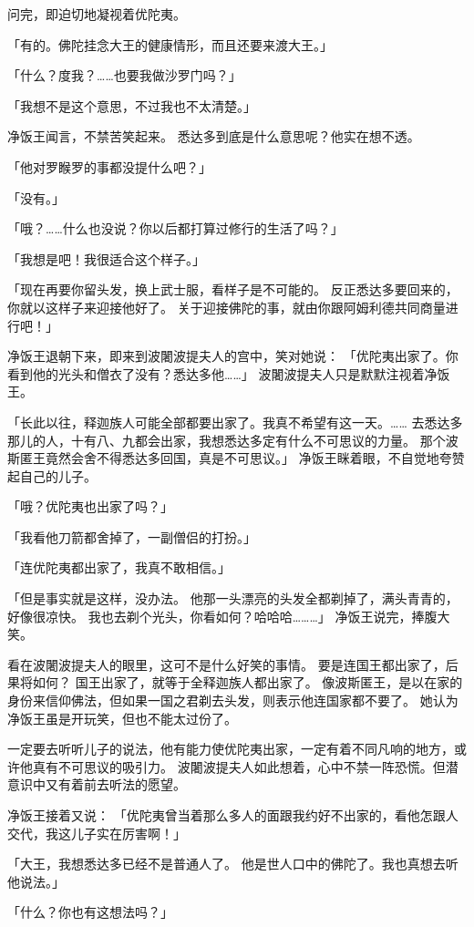 \documentclass[twoside,openany]{book}
\begin{document}
问完，即迫切地凝视着优陀夷。

「有的。佛陀挂念大王的健康情形，而且还要来渡大王。」

「什么？度我？……也要我做沙罗门吗？」

「我想不是这个意思，不过我也不太清楚。」

净饭王闻言，不禁苦笑起来。
悉达多到底是什么意思呢？他实在想不透。

「他对罗睺罗的事都没提什么吧？」

「没有。」

「哦？……什么也没说？你以后都打算过修行的生活了吗？」

「我想是吧！我很适合这个样子。」

「现在再要你留头发，换上武士服，看样子是不可能的。
反正悉达多要回来的，你就以这样子来迎接他好了。
关于迎接佛陀的事，就由你跟阿姆利德共同商量进行吧！」

净饭王退朝下来，即来到波闍波提夫人的宫中，笑对她说：
「优陀夷出家了。你看到他的光头和僧衣了没有？悉达多他……」
波闍波提夫人只是默默注视着净饭王。

「长此以往，释迦族人可能全部都要出家了。我真不希望有这一天。……
去悉达多那儿的人，十有八、九都会出家，我想悉达多定有什么不可思议的力量。
那个波斯匿王竟然会舍不得悉达多回国，真是不可思议。」
净饭王眯着眼，不自觉地夸赞起自己的儿子。

「哦？优陀夷也出家了吗？」

「我看他刀箭都舍掉了，一副僧侣的打扮。」

「连优陀夷都出家了，我真不敢相信。」

「但是事实就是这样，没办法。
他那一头漂亮的头发全都剃掉了，满头青青的，好像很凉快。
我也去剃个光头，你看如何？哈哈哈………」
净饭王说完，捧腹大笑。

看在波闍波提夫人的眼里，这可不是什么好笑的事情。
要是连国王都出家了，后果将如何？
国王出家了，就等于全释迦族人都出家了。
像波斯匿王，是以在家的身份来信仰佛法，但如果一国之君剃去头发，则表示他连国家都不要了。
她认为净饭王虽是开玩笑，但也不能太过份了。

一定要去听听儿子的说法，他有能力使优陀夷出家，一定有着不同凡响的地方，或许他真有不可思议的吸引力。
波闍波提夫人如此想着，心中不禁一阵恐慌。但潜意识中又有着前去听法的愿望。

净饭王接着又说：
「优陀夷曾当着那么多人的面跟我约好不出家的，看他怎跟人交代，我这儿子实在厉害啊！」

「大王，我想悉达多已经不是普通人了。
他是世人口中的佛陀了。我也真想去听他说法。」

「什么？你也有这想法吗？」
\end{document}
